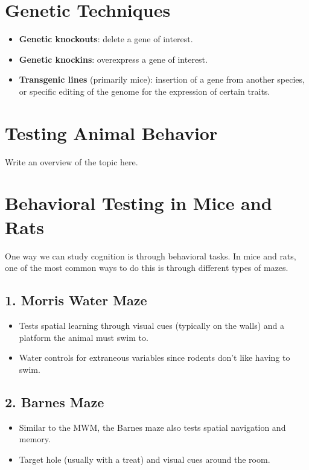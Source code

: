 \documentclass[12pt,a4paper]{article}
\begin{document}
	\section{Genetic Techniques}
	
	\begin{itemize}
		\item \textbf{Genetic knockouts}: delete a gene of interest. 
		\item \textbf{Genetic knockins}: overexpress a gene of interest. 
		\item \textbf{Transgenic lines} (primarily mice): insertion of a gene from another species, or specific editing of the genome for the expression of certain traits. 
	\end{itemize}
	
	\section*{Testing Animal Behavior}
	
	Write an overview of the topic here.
	
	\section{Behavioral Testing in Mice and Rats}
	
	One way we can study cognition is through behavioral tasks. In mice and rats, one of the most common ways to do this is through different types of mazes.
	
	\subsection{1. Morris Water Maze}
	
	\begin{itemize}
		\item Tests spatial learning through visual cues (typically on the walls) and a platform the animal must swim to. 
		\item Water controls for extraneous variables since rodents don't like having to swim. 
	\end{itemize} 
	
	\subsection{2. Barnes Maze}
	
	\begin{itemize}
		\item Similar to the MWM, the Barnes maze also tests spatial navigation and memory. 
		\item Target hole (usually with a treat) and visual cues around the room. 
	\end{itemize}
	
\end{document}
